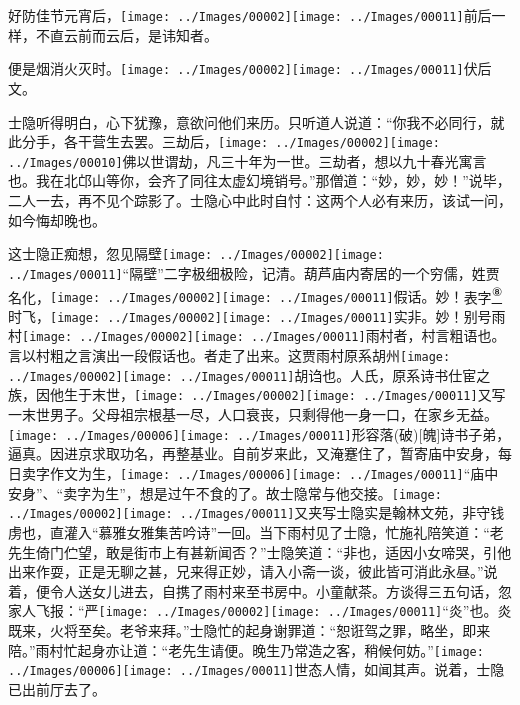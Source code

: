 好防佳节元宵后，{\texttt{[image: ../Images/00002]}\texttt{[image: ../Images/00011]}\footnotesize \kaishu 前后一样，不直云前而云后，是讳知者。}

便是烟消火灭时。{\texttt{[image: ../Images/00002]}\texttt{[image: ../Images/00011]}\footnotesize \kaishu 伏后文。}

士隐听得明白，心下犹豫，意欲问他们来历。只听道人说道：``你我不必同行，就此分手，各干营生去罢。三劫后，{\texttt{[image: ../Images/00002]}\texttt{[image: ../Images/00010]}\footnotesize \kaishu 佛以世谓劫，凡三十年为一世。三劫者，想以九十春光寓言也。}我在北邙山等你，会齐了同往太虚幻境销号。''那僧道：``妙，妙，妙！''说毕，二人一去，再不见个踪影了。士隐心中此时自忖：这两个人必有来历，该试一问，如今悔却晚也。

这士隐正痴想，忽见隔壁{\texttt{[image: ../Images/00002]}\texttt{[image: ../Images/00011]}\footnotesize \kaishu ``隔壁''二字极细极险，记清。}葫芦庙内寄居的一个穷儒，姓贾名化，{\texttt{[image: ../Images/00002]}\texttt{[image: ../Images/00011]}\footnotesize \kaishu 假话。妙！}表字\href{../Text/part0005_split_000.html\#lnkback_8_a}{\textsuperscript{⑧}}时飞，{\texttt{[image: ../Images/00002]}\texttt{[image: ../Images/00011]}\footnotesize \kaishu 实非。妙！}别号雨村{\texttt{[image: ../Images/00002]}\texttt{[image: ../Images/00011]}\footnotesize \kaishu 雨村者，村言粗语也。言以村粗之言演出一段假话也。}者走了出来。这贾雨村原系胡州{\texttt{[image: ../Images/00002]}\texttt{[image: ../Images/00011]}\footnotesize \kaishu 胡诌也。}人氏，原系诗书仕宦之族，因他生于末世，{\texttt{[image: ../Images/00002]}\texttt{[image: ../Images/00011]}\footnotesize \kaishu 又写一末世男子。}父母祖宗根基一尽，人口衰丧，只剩得他一身一口，在家乡无益。{\texttt{[image: ../Images/00006]}\texttt{[image: ../Images/00011]}\footnotesize \kaishu 形容落{(破)}{[}魄{]}诗书子弟，逼真。}因进京求取功名，再整基业。自前岁来此，又淹蹇住了，暂寄庙中安身，每日卖字作文为生，{\texttt{[image: ../Images/00006]}\texttt{[image: ../Images/00011]}\footnotesize \kaishu ``庙中安身''、``卖字为生''，想是过午不食的了。}故士隐常与他交接。{\texttt{[image: ../Images/00002]}\texttt{[image: ../Images/00011]}\footnotesize \kaishu 又夹写士隐实是翰林文苑，非守钱虏也，直灌入``慕雅女雅集苦吟诗''一回。}当下雨村见了士隐，忙施礼陪笑道：``老先生倚门伫望，敢是街市上有甚新闻否？''士隐笑道：``非也，适因小女啼哭，引他出来作耍，正是无聊之甚，兄来得正妙，请入小斋一谈，彼此皆可消此永昼。''说着，便令人送女儿进去，自携了雨村来至书房中。小童献茶。方谈得三五句话，忽家人飞报：``严{\texttt{[image: ../Images/00002]}\texttt{[image: ../Images/00011]}\footnotesize \kaishu ``炎''也。炎既来，火将至矣。}老爷来拜。''士隐忙的起身谢罪道：``恕诳驾之罪，略坐，即来陪。''雨村忙起身亦让道：``老先生请便。晚生乃常造之客，稍候何妨。''{\texttt{[image: ../Images/00006]}\texttt{[image: ../Images/00011]}\footnotesize \kaishu 世态人情，如闻其声。}说着，士隐已出前厅去了。

